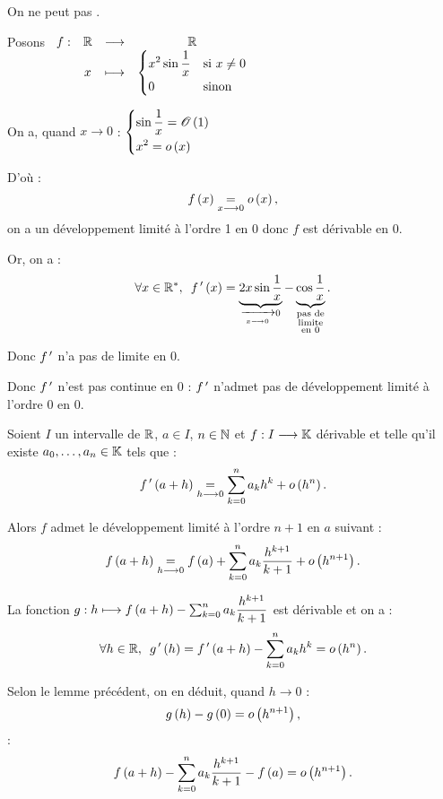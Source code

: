 \begin{rem}
On ne peut pas .
\end{rem}

\begin{dem}
Posons \(\begin{array}[t]{cccc}f : & \mathbb{R} & \longrightarrow & \mathbb{R} \\ & x & \longmapsto & \begin{dcases}x^2\sin\dfrac{1}{x} &\text{si }x\not=0 \\ 0 &\text{sinon}\end{dcases}\end{array}\)

On a, quand \(x\to0\) : \(\begin{dcases}
\sin\dfrac{1}{x}=\mathscr{O}\left(1\right) \\
x^2=o\left(x\right)
\end{dcases}\)

D'où : \[f\left(x\right)\underset{x\longrightarrow0}{=}o\left(x\right),\] on a un développement limité à l'ordre 1 en \(0\) donc \(f\) est dérivable en \(0\).

Or, on a : \[\quantifs{\forall x\in\Rs}f\prim\paren{x}=\underbrace{2x\sin\dfrac{1}{x}}_{\tendqd{x\to0}0}-\underbrace{\cos\dfrac{1}{x}}_{\substack{\text{pas de} \\ \text{limite} \\ \text{en }0}}.\]

Donc \(f^{\,\prime}\) n'a pas de limite en \(0\).

Donc \(f^{\,\prime}\) n'est pas continue en \(0\) : \(f^{\,\prime}\) n'admet pas de développement limité à l'ordre 0 en \(0\).
\end{dem}

\begin{prop}
Soient \(I\) un intervalle de \(\mathbb{R}\), \(a\in I\), \(n\in\mathbb{N}\) et \(f:I\longrightarrow\mathbb{K}\) dérivable et telle qu'il existe \(a_0,\dots,a_n\in\mathbb{K}\) tels que : \[f^{\,\prime}\left(a+h\right)\underset{h\longrightarrow0}{=}\sum_{k=0}^na_kh^k+o\left(h^n\right).\]

Alors \(f\) admet le développement limité à l'ordre \(n+1\) en \(a\) suivant : \[f\left(a+h\right)\underset{h\longrightarrow0}{=}f\left(a\right)+\sum_{k=0}^na_k\dfrac{h^{k+1}}{k+1}+o\left(h^{n+1}\right).\]
\end{prop}

\begin{dem}
La fonction \(g:h\longmapsto f\left(a+h\right)-\sum_{k=0}^na_k\dfrac{h^{k+1}}{k+1}\) est dérivable et on a : \[\quantifs{\forall h\in\R}g\prim\paren{h}=f\prim\paren{a+h}-\sum_{k=0}^na_kh^k=\o{h^n}.\]

Selon le lemme précédent, on en déduit, quand \(h\to0\) : \[g\left(h\right)-g\left(0\right)=o\left(h^{n+1}\right),\] \cad : \[f\left(a+h\right)-\sum_{k=0}^na_k\dfrac{h^{k+1}}{k+1}-f\left(a\right)=o\left(h^{n+1}\right).\]
\end{dem}

